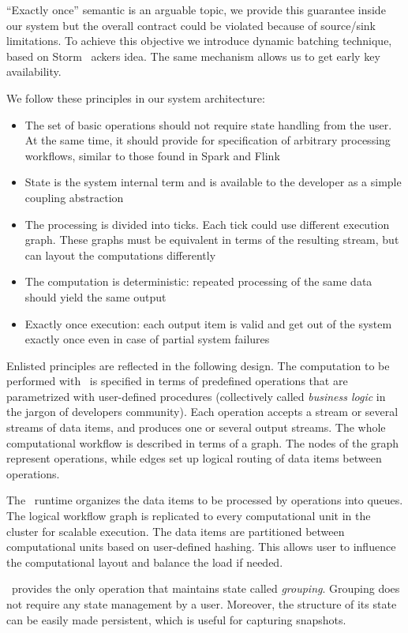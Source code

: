 ``Exactly once'' semantic is an arguable topic, we provide this guarantee inside our system but the overall contract could be violated because of source/sink limitations. To achieve this objective we introduce dynamic batching technique, based on Storm~\cite{apache:storm} ackers idea. The same mechanism allows us to get early key availability.

We follow these principles in our system architecture:
\begin{itemize}
\item The set of basic operations should not require state handling from the user. At the same time, it should provide for specification of arbitrary processing workflows, similar to those found in Spark and Flink
\item State is the system internal term and is available to the developer as a simple coupling abstraction
\item The processing is divided into ticks. Each tick could use different execution graph. These graphs must be equivalent in terms of the resulting stream, but can layout the computations differently
\item The computation is deterministic: repeated processing of the same data should yield the same output
\item Exactly once execution: each output item is valid and get out of the system exactly once even in case of partial system failures
\end{itemize}

Enlisted principles are reflected in the following design. The computation to be performed with \FlameStream\ is specified in terms of predefined operations that are parametrized with user-defined procedures (collectively called {\em business logic} in the jargon of developers community). Each operation accepts a stream or several streams of data items, and produces one or several output streams. The whole computational workflow is described in terms of a graph. The nodes of the graph represent operations, while edges set up logical routing of data items between operations.

The \FlameStream\ runtime organizes the data items to be processed by operations into queues. The logical workflow graph is replicated to every computational unit in the cluster for scalable execution. The data items are partitioned between computational units based on user-defined hashing. This allows user to influence the computational layout and balance the load if needed.

\FlameStream\ provides the only operation that maintains state called {\it grouping}. Grouping does not require any state management by a user. Moreover, the structure of its state can be easily made persistent, which is useful for capturing snapshots.

